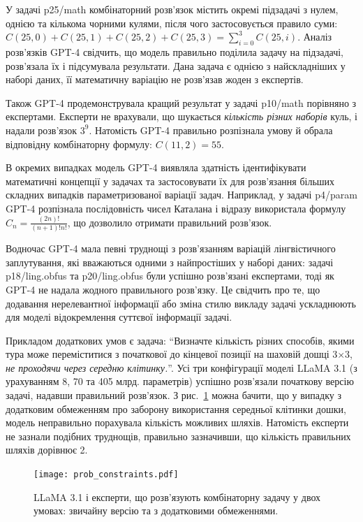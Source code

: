 У задачі p25/math комбінаторний розв’язок містить окремі підзадачі з нулем, однією та кількома чорними кулями, після чого застосовується правило суми: \(C(25, 0) + C(25, 1) + C(25, 2) + C(25, 3) = \sum_{i=0}^{3} C(25, i)\). Аналіз розв’язків GPT-4 свідчить, що модель правильно поділила задачу на підзадачі, розв’язала їх і підсумувала результати. Дана задача є однією з найскладніших у наборі даних, її математичну варіацію не розв’язав жоден з експертів.

Також GPT-4 продемонструвала кращий результат у задачі p10/math порівняно з експертами. Експерти не врахували, що шукається \textit{кількість різних наборів} куль, і надали розв’язок \(3^9\). Натомість GPT-4 правильно розпізнала умову й обрала відповідну комбінаторну формулу: \(C(11, 2) = 55\).

В окремих випадках модель GPT-4 виявляла здатність ідентифікувати математичні концепції у задачах та застосовувати їх для розв’язання більших складних випадків параметризованої варіації задач. Наприклад, у задачі p4/param GPT-4 розпізнала послідовність чисел Каталана і відразу використала формулу \(C_n = \frac{(2n)!}{(n + 1)!n!}\), що дозволило отримати правильний розв'язок.

Водночас GPT-4 мала певні труднощі з розв’язанням варіацій лінгвістичного заплутування, які вважаються одними з найпростіших у наборі даних: задачі p18/ling.obfus та p20/ling.obfus були успішно розв’язані експертами, тоді як GPT-4 не надала жодного правильного розв’язку. Це свідчить про те, що додавання нерелевантної інформації або зміна стилю викладу задачі ускладнюють для моделі відокремлення суттєвої інформації задачі.

Прикладом додаткових умов є задача: ``Визначте кількість різних способів, якими тура може переміститися з початкової до кінцевої позиції на шаховій дошці 3×3, \textit{не проходячи через середню клітинку.}''. Усі три конфігурації моделі LLaMA 3.1 (з урахуванням 8, 70 та 405 млрд. параметрів) успішно розв’язали початкову версію задачі, надавши правильний розв’язок. З  рис.~\ref{fig:prob_constraints} можна бачити, що у випадку з додатковим обмеженням про заборону використання середньої клітинки дошки, модель неправильно порахувала кількість можливих шляхів. Натомість експерти не зазнали подібних труднощів, правильно зазначивши, що кількість правильних шляхів дорівнює 2.

\begin{figure}[h]
    \centering
    \texttt{[image: prob\_constraints.pdf]}
    \caption{LLaMA 3.1 і експерти, що розв’язують комбінаторну задачу у двох умовах: звичайну версію та з додатковими обмеженнями.}
    \label{fig:prob_constraints}
\end{figure}

